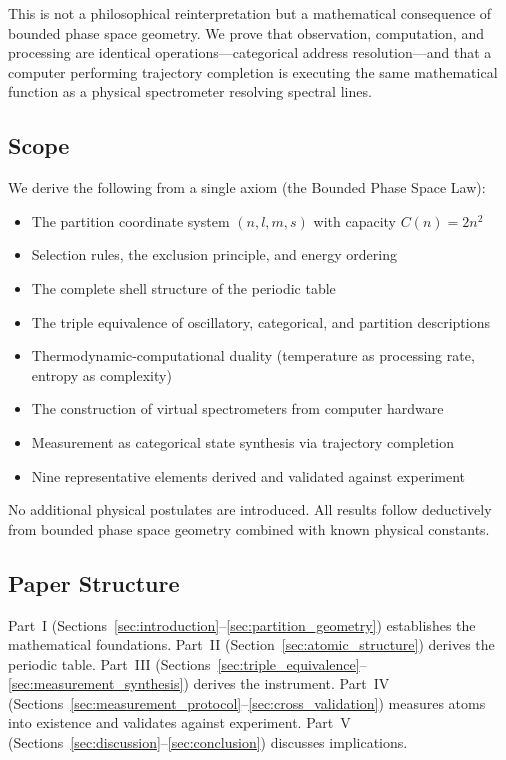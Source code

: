 \documentclass[11pt,twocolumn,a4paper]{article}
\theoremstyle{definition}
\theoremstyle{remark}
\begin{document}
This is not a philosophical reinterpretation but a mathematical consequence of bounded phase space geometry. We prove that observation, computation, and processing are identical operations---categorical address resolution---and that a computer performing trajectory completion is executing the same mathematical function as a physical spectrometer resolving spectral lines.

\subsection{Scope}

We derive the following from a single axiom (the Bounded Phase Space Law):
\begin{itemize}[nosep]
\item The partition coordinate system $(n, l, m, s)$ with capacity $C(n) = 2n^2$
\item Selection rules, the exclusion principle, and energy ordering
\item The complete shell structure of the periodic table
\item The triple equivalence of oscillatory, categorical, and partition descriptions
\item Thermodynamic-computational duality (temperature as processing rate, entropy as complexity)
\item The construction of virtual spectrometers from computer hardware
\item Measurement as categorical state synthesis via trajectory completion
\item Nine representative elements derived and validated against experiment
\end{itemize}

No additional physical postulates are introduced. All results follow deductively from bounded phase space geometry combined with known physical constants.

\subsection{Paper Structure}

Part~I (Sections~\ref{sec:introduction}--\ref{sec:partition_geometry}) establishes the mathematical foundations. Part~II (Section~\ref{sec:atomic_structure}) derives the periodic table. Part~III (Sections~\ref{sec:triple_equivalence}--\ref{sec:measurement_synthesis}) derives the instrument. Part~IV (Sections~\ref{sec:measurement_protocol}--\ref{sec:cross_validation}) measures atoms into existence and validates against experiment. Part~V (Sections~\ref{sec:discussion}--\ref{sec:conclusion}) discusses implications.
\end{document}
